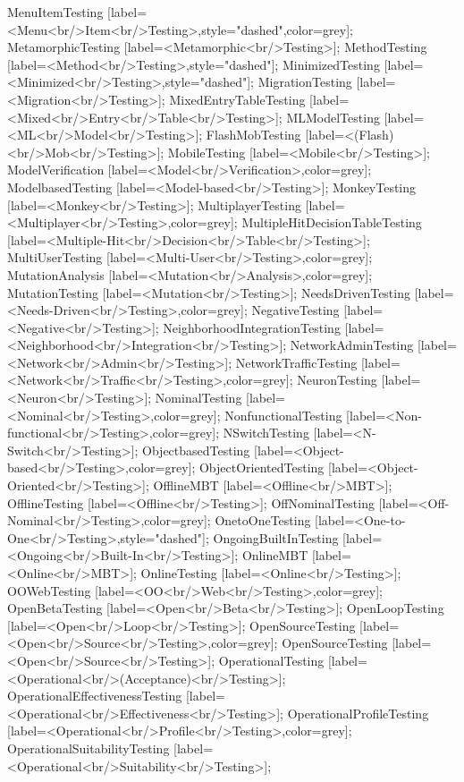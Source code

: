 \documentclass{article}
\begin{document}
{MenuItemTesting [label=<Menu<br/>Item<br/>Testing>,style="dashed",color=grey];
MetamorphicTesting [label=<Metamorphic<br/>Testing>];
MethodTesting [label=<Method<br/>Testing>,style="dashed"];
MinimizedTesting [label=<Minimized<br/>Testing>,style="dashed"];
MigrationTesting [label=<Migration<br/>Testing>];
MixedEntryTableTesting [label=<Mixed<br/>Entry<br/>Table<br/>Testing>];
MLModelTesting [label=<ML<br/>Model<br/>Testing>];
FlashMobTesting [label=<(Flash)<br/>Mob<br/>Testing>];
MobileTesting [label=<Mobile<br/>Testing>];
ModelVerification [label=<Model<br/>Verification>,color=grey];
ModelbasedTesting [label=<Model-based<br/>Testing>];
MonkeyTesting [label=<Monkey<br/>Testing>];
MultiplayerTesting [label=<Multiplayer<br/>Testing>,color=grey];
MultipleHitDecisionTableTesting [label=<Multiple-Hit<br/>Decision<br/>Table<br/>Testing>];
MultiUserTesting [label=<Multi-User<br/>Testing>,color=grey];
MutationAnalysis [label=<Mutation<br/>Analysis>,color=grey];
MutationTesting [label=<Mutation<br/>Testing>];
NeedsDrivenTesting [label=<Needs-Driven<br/>Testing>,color=grey];
NegativeTesting [label=<Negative<br/>Testing>];
NeighborhoodIntegrationTesting [label=<Neighborhood<br/>Integration<br/>Testing>];
NetworkAdminTesting [label=<Network<br/>Admin<br/>Testing>];
NetworkTrafficTesting [label=<Network<br/>Traffic<br/>Testing>,color=grey];
NeuronTesting [label=<Neuron<br/>Testing>];
NominalTesting [label=<Nominal<br/>Testing>,color=grey];
NonfunctionalTesting [label=<Non-functional<br/>Testing>,color=grey];
NSwitchTesting [label=<N-Switch<br/>Testing>];
ObjectbasedTesting [label=<Object-based<br/>Testing>,color=grey];
ObjectOrientedTesting [label=<Object-Oriented<br/>Testing>];
OfflineMBT [label=<Offline<br/>MBT>];
OfflineTesting [label=<Offline<br/>Testing>];
OffNominalTesting [label=<Off-Nominal<br/>Testing>,color=grey];
OnetoOneTesting [label=<One-to-One<br/>Testing>,style="dashed"];
OngoingBuiltInTesting [label=<Ongoing<br/>Built-In<br/>Testing>];
OnlineMBT [label=<Online<br/>MBT>];
OnlineTesting [label=<Online<br/>Testing>];
OOWebTesting [label=<OO<br/>Web<br/>Testing>,color=grey];
OpenBetaTesting [label=<Open<br/>Beta<br/>Testing>];
OpenLoopTesting [label=<Open<br/>Loop<br/>Testing>];
OpenSourceTesting [label=<Open<br/>Source<br/>Testing>,color=grey];
OpenSourceTesting [label=<Open<br/>Source<br/>Testing>];
OperationalTesting [label=<Operational<br/>(Acceptance)<br/>Testing>];
OperationalEffectivenessTesting [label=<Operational<br/>Effectiveness<br/>Testing>];
OperationalProfileTesting [label=<Operational<br/>Profile<br/>Testing>,color=grey];
OperationalSuitabilityTesting [label=<Operational<br/>Suitability<br/>Testing>];
}
\end{document}
